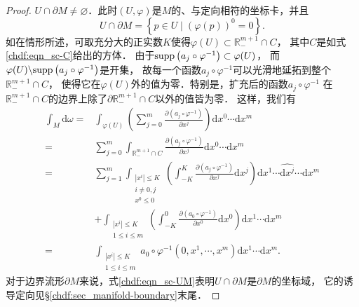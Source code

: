 \begin{proof}
    $U \cap \partial M \neq \varnothing$．此时$(U, \varphi)$是$M$的、与定向相符的坐标卡，并且
    \begin{equation}\label{chdf:eqn_sc-UM}
    	U \cap \partial M=\left\{p \in U \mid \left(\varphi(p)\right)^0=0\right\} .
    \end{equation}    
    如在情形所述，可取充分大的正实数$K$使得$\varphi(U) \subset \mathbb{R}_{-}^{m+1} \cap C$，
    其中$C$是如式\eqref{chdf:eqn_sc-C}给出的方体．
    由于${\rm supp}\left(a_j \circ \varphi^{-1}\right) \subset \varphi(U)$，
    而$\varphi(U) \backslash {\rm supp}\left(a_j \circ \varphi^{-1}\right)$是开集，
    故每一个函数$a_j \circ \varphi^{-1}$可以光滑地延拓到整个$\mathbb{R}_{-}^{m+1} \cap C$，
    使得它在$\varphi(U)$外的值为零．特别是，扩充后的函数$a_j \circ \varphi^{-1}$
    在$\mathbb{R}_{-}^{m+1} \cap C$的边界上除了$\partial \mathbb{R}_{-}^{m+1} \cap C$以外的值皆为零．
    这样，我们有
    \begin{align*}
    	\int_M \mathrm{d} \omega=&
    	\int_{\varphi(U)}\left(\sum_{j=0}^m \frac{\partial\left(a_j \circ \varphi^{-1}\right)}{\partial x^j}\right) 
    	\mathrm{d} x^0 \cdots \mathrm{d} x^m\\
    	= & \sum_{j=0}^m \int_{\mathbb{R}_{-}^{m+1} \cap C} \frac{\partial\left(a_j \circ \varphi^{-1}\right)}{\partial x^j} 
    	\mathrm{d} x^0 \cdots \mathrm{d} x^m \\
    	= & \sum_{j=1}^{m} \int_{\substack{|x^i| \leqslant K \\ i \neq 0, j \\ x^0 \leqslant 0}}
    		\left(\int_{-K}^K \frac{\partial\left(a_j \circ \varphi^{-1}\right)}{\partial x^j} \mathrm{d} x^j\right) 
    		\mathrm{d} x^1 \cdots \widehat{\mathrm{d}x^j}  \cdots \mathrm{d} x^m \\
    	& +\int_{\substack{|x^i| \leqslant K \\ 1 \leqslant i \leqslant m}}
    	\left(\int_{-K}^{0} \frac{\partial\left(a_0 \circ \varphi^{-1}\right)}{\partial x^0} \mathrm{d} x^0\right) 
    	\mathrm{d} x^1 \cdots \mathrm{d} x^{m} \\
    	= & \int_{\substack{|x^{i}| \leqslant K \\
    			1 \leqslant i \leqslant m}} a_0 \circ \varphi^{-1}\left(0,x^1, \cdots, x^{m}\right) 
    		\mathrm{d} x^1 \cdots \mathrm{d} x^{m} .
    \end{align*}
    对于边界流形$\partial M$来说，式\eqref{chdf:eqn_sc-UM}表明$U \cap \partial M$是$\partial M$的坐标域，
    它的诱导定向见\S\ref{chdf:sec_manifold-boundary}末尾．

\end{proof}
